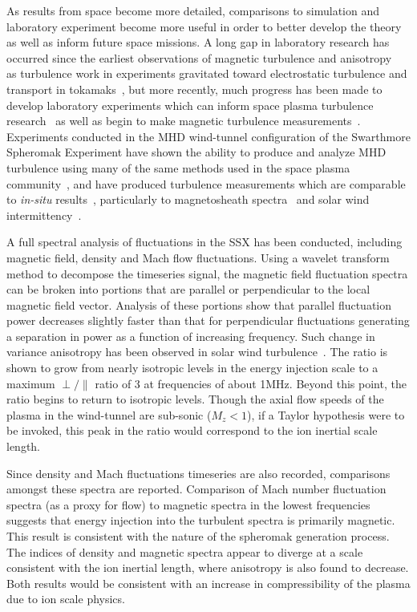 \documentclass[preprint2]{aastex}
\begin{document}
As results from space become more detailed, comparisons to simulation and laboratory experiment become more useful in order to better develop the theory as well as inform future space missions. A long gap in laboratory research has occurred since the earliest observations of magnetic turbulence and anisotropy~\citep{rob71} as turbulence work in experiments gravitated toward electrostatic turbulence and transport in tokamaks~\citep{lie85,tyn09}, but more recently, much progress has been made to develop laboratory experiments which can inform space plasma turbulence research~\citep{how12} as well as begin to make magnetic turbulence measurements~\citep{ren11}. Experiments conducted in the MHD wind-tunnel configuration of the Swarthmore Spheromak Experiment have shown the ability to produce and analyze MHD turbulence using many of the same methods used in the space plasma community~\citep{dud13}, and have produced turbulence measurements which are comparable to \textit{in-situ} results~\citep{sch14a,sch14b}, particularly to magnetosheath spectra~\citep{yor08} and solar wind intermittency~\citep{sor99}.

A full spectral analysis of fluctuations in the SSX has been conducted, including magnetic field, density and Mach flow fluctuations. Using a wavelet transform method to decompose the timeseries signal, the magnetic field fluctuation spectra can be broken into portions that are parallel or perpendicular to the local magnetic field vector. Analysis of these portions show that parallel fluctuation power decreases slightly faster than that for perpendicular fluctuations generating a separation in power as a function of increasing frequency. Such change in variance anisotropy has been observed in solar wind turbulence~\citep{kiy13}. The ratio is shown to grow from nearly isotropic levels in the energy injection scale to a maximum $\perp/\parallel$ ratio of 3 at frequencies of about 1MHz. Beyond this point, the ratio begins to return to isotropic levels. Though the axial flow speeds of the plasma in the wind-tunnel are sub-sonic ($M_{z} < 1$), if a Taylor hypothesis were to be invoked, this peak in the ratio would correspond to the ion inertial scale length. 

Since density and Mach fluctuations timeseries are also recorded, comparisons amongst these spectra are reported. Comparison of Mach number fluctuation spectra (as a proxy for flow) to magnetic spectra in the lowest frequencies suggests that energy injection into the turbulent spectra is primarily magnetic. This result is consistent with the nature of the spheromak generation process. The indices of density and magnetic spectra appear to diverge at a scale consistent with the ion inertial length, where anisotropy is also found to decrease. Both results would be consistent with an increase in compressibility of the plasma due to ion scale physics.
\end{document}
